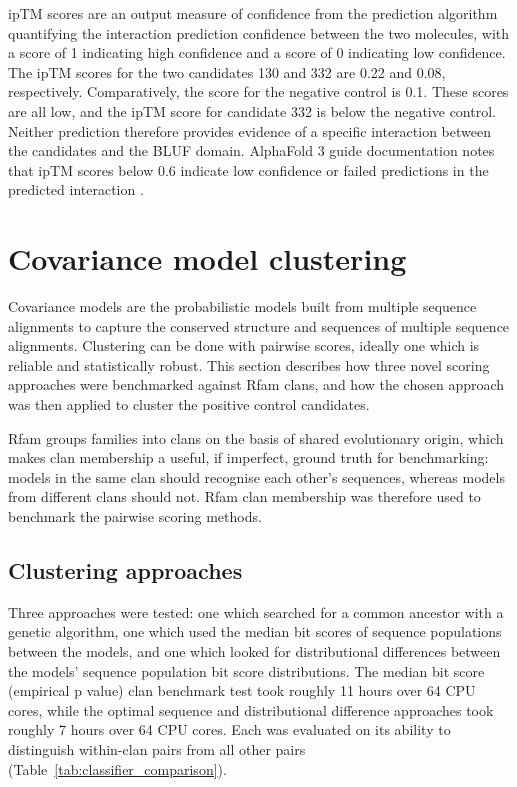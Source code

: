 \ac{ipTM} scores are an output measure of confidence from the prediction algorithm quantifying the interaction prediction confidence between the two molecules, with a score of 1 indicating high confidence and a score of 0 indicating low confidence.
The \ac{ipTM} scores for the two candidates 130 and 332 are 0.22 and 0.08, respectively.
Comparatively, the score for the negative control is 0.1.
These scores are all low, and the \ac{ipTM} score for candidate 332 is below the negative control.
Neither prediction therefore provides evidence of a specific interaction between the candidates and the \ac{BLUF} domain.
AlphaFold 3 guide documentation notes that \ac{ipTM} scores below 0.6 indicate low confidence or failed predictions in the predicted interaction \citep{Embl-Ebi2026}.

\section{Covariance model clustering}

Covariance models are the probabilistic models built from multiple sequence alignments to capture the conserved structure and sequences of multiple sequence alignments.
Clustering can be done with pairwise scores, ideally one which is reliable and statistically robust. 
This section describes how three novel scoring approaches were benchmarked against Rfam clans, and how the chosen approach was then applied to cluster the positive control candidates.

Rfam groups families into clans on the basis of shared evolutionary origin, which makes clan membership a useful, if imperfect, ground truth for benchmarking: models in the same clan should recognise each other's sequences, whereas models from different clans should not. 
Rfam clan membership was therefore used to benchmark the pairwise scoring methods.

\subsection{Clustering approaches}

Three approaches were tested: one which searched for a common ancestor with a genetic algorithm, one which used the median bit scores of sequence populations between the models, and one which looked for distributional differences between the models' sequence population bit score distributions. 
The median bit score (empirical p value) clan benchmark test took roughly 11 hours over 64 \ac{CPU} cores, while the optimal sequence and distributional difference approaches took roughly 7 hours over 64 \ac{CPU} cores.
Each was evaluated on its ability to distinguish within-clan pairs from all other pairs (Table~\ref{tab:classifier_comparison}).

